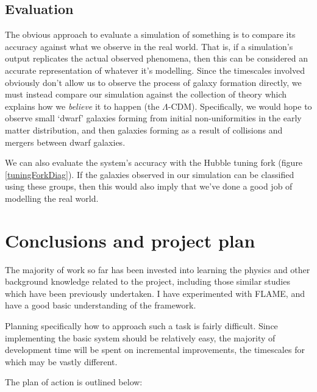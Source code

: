 \documentclass[11pt,a4paper]{article}
\begin{document}
\subsection{Evaluation}
\label{evaluation}
The obvious approach to evaluate a simulation of something is to compare its accuracy against what we observe in the real world. That is, if a simulation's output replicates the actual observed phenomena, then this can be considered an accurate representation of whatever it's modelling. Since the timescales involved obviously don't allow us to observe the process of galaxy formation directly, we must instead compare our simulation against the collection of theory which explains how we \emph{believe} it to happen (the $\Lambda$-CDM). Specifically, we would hope to observe small `dwarf' galaxies forming from initial non-uniformities in the early matter distribution, and then galaxies forming as a result of collisions and mergers between dwarf galaxies. 

We can also evaluate the system's accuracy with the Hubble tuning fork (figure \ref{tuningForkDiag}). If the galaxies observed in our simulation can be classified using these groups, then this would also imply that we've done a good job of modelling the real world.

\section{Conclusions and project plan}
The majority of work so far has been invested into learning the physics and other background knowledge related to the project, including those similar studies which have been previously undertaken. I have experimented with FLAME, and have a good basic understanding of the framework.

Planning specifically how to approach such a task is fairly difficult. Since implementing the basic system should be relatively easy, the majority of development time will be spent on incremental improvements, the timescales for which may be vastly different.

The plan of action is outlined below:
\end{document}
